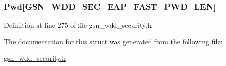 \hypertarget{a00289_a40435d219dbf1d83e3f9cf72b264df06}{
\subsubsection[{Pwd}]{ {\bf Pwd}\mbox{[}GSN\_\-WDD\_\-SEC\_\-EAP\_\-FAST\_\-PWD\_\-LEN\mbox{]}}}
\label{a00289_a40435d219dbf1d83e3f9cf72b264df06}


Definition at line 275 of file gsn\_\-wdd\_\-security.h.



The documentation for this struct was generated from the following file:\begin{DoxyCompactItemize}
\item 
\hyperlink{a00604}{gsn\_\-wdd\_\-security.h}\end{DoxyCompactItemize}
